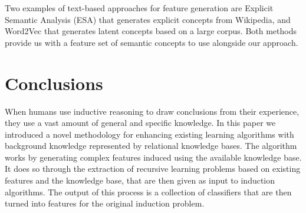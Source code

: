 \documentclass[letterpaper]{article} %
\theoremstyle{definition}
\begin{document}

Two examples of text-based approaches for feature generation are 
Explicit Semantic Analysis (ESA) \cite{gabrilovich2009wikipediafull} that generates explicit concepts from Wikipedia, and Word2Vec \cite{mikolov2013distributed} that generates latent concepts based on a large corpus. Both methods provide us with a feature set of semantic concepts to use alongside our approach.


\section{Conclusions}

When humans use inductive reasoning to draw conclusions from their experience, they use a vast amount of general and specific knowledge. In this paper we introduced a novel methodology for enhancing existing learning algorithms with background knowledge represented by relational knowledge bases.
The algorithm works by generating complex features induced using the available knowledge base. It does so through the extraction of recursive learning problems based on existing features and the knowledge base, that are then given as input to induction algorithms. The output of this process is a collection of classifiers that are then turned into features for the original induction problem.
\end{document}
